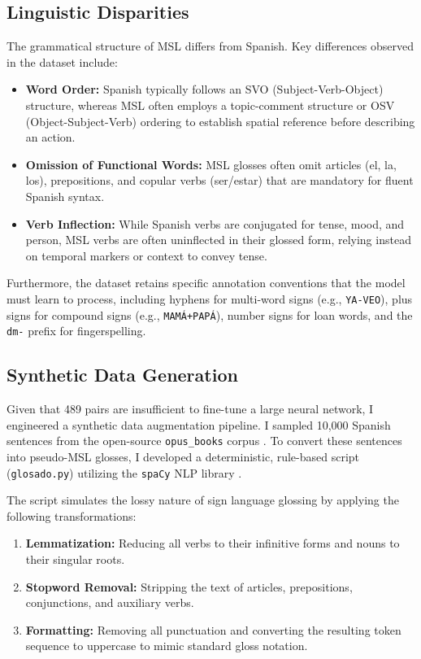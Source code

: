 \documentclass[11pt,a4paper,english]{ceurart}
\begin{document}
\subsection{Linguistic Disparities}
The grammatical structure of MSL differs from Spanish. Key differences observed in the dataset include:
\begin{itemize}
    \item \textbf{Word Order:} Spanish typically follows an SVO (Subject-Verb-Object) structure, whereas MSL often employs a topic-comment structure or OSV (Object-Subject-Verb) ordering to establish spatial reference before describing an action.
    \item \textbf{Omission of Functional Words:} MSL glosses often omit articles (el, la, los), prepositions, and copular verbs (ser/estar) that are mandatory for fluent Spanish syntax.
    \item \textbf{Verb Inflection:} While Spanish verbs are conjugated for tense, mood, and person, MSL verbs are often uninflected in their glossed form, relying instead on temporal markers or context to convey tense.
\end{itemize}

Furthermore, the dataset retains specific annotation conventions that the model must learn to process, including hyphens for multi-word signs (e.g., \texttt{YA-VEO}), plus signs for compound signs (e.g., \texttt{MAM\'A+PAP\'A}), number signs for loan words, and the \texttt{dm-} prefix for fingerspelling.

\subsection{Synthetic Data Generation}
Given that 489 pairs are insufficient to fine-tune a large neural network, I engineered a synthetic data augmentation pipeline. I sampled 10,000 Spanish sentences from the open-source \texttt{opus\_books} corpus \cite{tiedemann2012parallel}. To convert these sentences into pseudo-MSL glosses, I developed a deterministic, rule-based script (\texttt{glosado.py}) utilizing the \texttt{spaCy} NLP library \cite{honnibal2017spacy}.

The script simulates the lossy nature of sign language glossing by applying the following transformations:
\begin{enumerate}
    \item \textbf{Lemmatization:} Reducing all verbs to their infinitive forms and nouns to their singular roots.
    \item \textbf{Stopword Removal:} Stripping the text of articles, prepositions, conjunctions, and auxiliary verbs.
    \item \textbf{Formatting:} Removing all punctuation and converting the resulting token sequence to uppercase to mimic standard gloss notation.
\end{enumerate}
\end{document}
